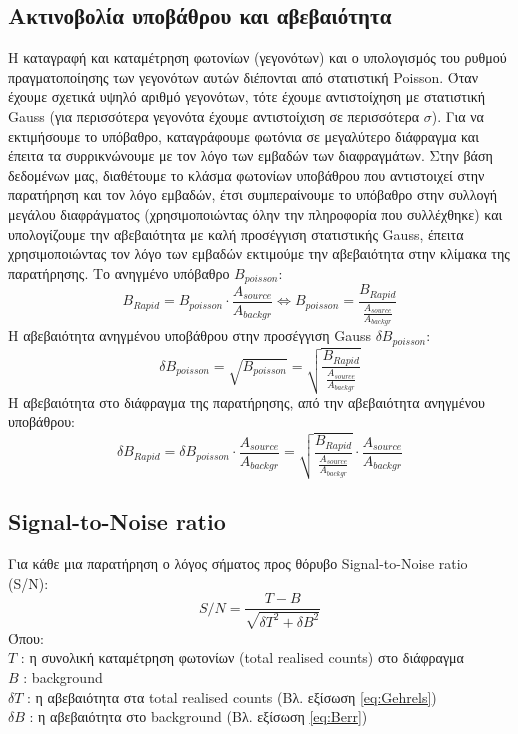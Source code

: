 
\subsection{Ακτινοβολία υποβάθρου και αβεβαιότητα}

Η καταγραφή και καταμέτρηση φωτονίων (γεγονότων) και ο υπολογισμός του ρυθμού πραγματοποίησης των γεγονότων αυτών διέπονται από στατιστική \textlatin{Poisson}. Όταν έχουμε σχετικά υψηλό αριθμό γεγονότων, τότε έχουμε αντιστοίχηση με στατιστική \textlatin{Gauss} (για περισσότερα γεγονότα έχουμε αντιστοίχιση σε περισσότερα $\sigma$)\cite{1986ApJ...303..336G}. Για να εκτιμήσουμε το υπόβαθρο, καταγράφουμε φωτόνια σε μεγαλύτερο διάφραγμα και έπειτα τα συρρικνώνουμε με τον λόγο των εμβαδών των διαφραγμάτων. Στην βάση δεδομένων μας, διαθέτουμε το κλάσμα φωτονίων υποβάθρου που αντιστοιχεί στην παρατήρηση και τον λόγο εμβαδών, έτσι συμπεραίνουμε το υπόβαθρο στην συλλογή μεγάλου διαφράγματος (χρησιμοποιώντας όλην την πληροφορία που συλλέχθηκε) και υπολογίζουμε την αβεβαιότητα με καλή προσέγγιση στατιστικής \textlatin{Gauss}, έπειτα χρησιμοποιώντας τον λόγο των εμβαδών εκτιμούμε την αβεβαιότητα στην κλίμακα της παρατήρησης.
Το ανηγμένο υπόβαθρο $B_{poisson}$:
\begin{equation}
    B_{Rapid} = B_{poisson}  \cdot \frac {A_{source} }{A_{backgr}} \iff B_{poisson} =   \dfrac{ B_{Rapid} }{\frac {Α_{source} }{Α_{backgr}} } \label{eq:Background}
\end{equation}
H αβεβαιότητα ανηγμένου υποβάθρου στην προσέγγιση \textlatin{Gauss} $\delta B_{poisson}$:
\begin{equation}
     \delta B_{poisson} = \sqrt{ B_{poisson}} =\sqrt{ \dfrac{ B_{Rapid} }{\frac {Α_{source}}{Α_{backgr}} }}
\end{equation}
H αβεβαιότητα στο διάφραγμα της παρατήρησης, από την αβεβαιότητα ανηγμένου υποβάθρου:
\begin{equation}
     \delta B_{Rapid} = \delta B_{poisson} \cdot \frac {A_{source} }{A_{backgr}}= \sqrt{ \dfrac{ B_{Rapid} }{\frac {Α_{source}}{Α_{backgr}} }}\cdot \frac {A_{source} }{A_{backgr}} \label{eq:Berr}
\end{equation}

\subsection{\textlatin{Signal-to-Noise ratio} }
Για κάθε μια παρατήρηση ο λόγος σήματος προς θόρυβο \textlatin{Signal-to-Noise ratio (S/N)}:   
\begin{equation}   S/N = \frac{T-B}{\sqrt{\delta T^2 + \delta B^2}} \end{equation}
Όπου:\\     
$T$ :  η συνολική καταμέτρηση φωτονίων (\textlatin{total realised counts}) στο διάφραγμα \\
$B$ : \textlatin{background}  \\   
$\delta T$ : η αβεβαιότητα στα \textlatin{total realised counts} (Βλ. εξίσωση \ref{eq:Gehrels})\\
$\delta B$ : η αβεβαιότητα στο \textlatin{background} (Βλ. εξίσωση \ref{eq:Berr})

